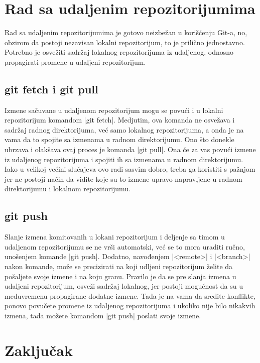 \documentclass[a4paper]{article}
\begin{document}
{\section{Rad sa udaljenim repozitorijumima}
\label{sec:udaljeni_repozitorijumi}
Rad sa udaljenim repozitorijumima je gotovo neizbežan u korišćenju Git-a, no, obzirom da postoji nezavisan lokalni repozitorijum, to je prilično jednostavno. Potrebno je osvežiti sadržaj lokalnog repozitorijuma iz udaljenog, odnosno propagirati promene u udaljeni repozitorijum.


\subsection{git fetch i git pull}
\label{subsec:git_pull}
Izmene sačuvane u udaljenom repozitorijum mogu se povući i u lokalni repozitorijum komandom |git fetch|. Medjutim, ova komanda ne osvežava i sadržaj radnog direktorijuma, već samo lokalnog repozitorijuma, a onda je na vama da to spojite sa izmenama u radnom direktorijumu. Ono što donekle ubrzava i olakšava ovaj proces je komanda |git pull|. Ona će za vas povući izmene iz udaljenog repozitorijuma i spojiti ih sa izmenama u radnom direktorijumu. Iako u velikoj većini slučajeva ovo radi sasvim dobro, treba ga koristiti s pažnjom jer ne postoji način da vidite koje su to izmene upravo napravljene u radnom direktorijumu i lokalnom repozitorijumu.




\subsection{git push}
\label{subsec:git_push}
Slanje izmena komitovanih u lokani repozitorijum i deljenje sa timom u udaljenom repozitorijumu se ne vrši automatski, već se to mora uraditi ručno, unošenjem komande |git push|. Dodatno, navođenjem |<remote>| i |<branch>| nakon komande, može se precizirati na koji udljeni repozitorijum želite da pošaljete svoje izmene i na koju granu. Pravilo je da se pre slanja izmena u udaljeni repozitorijum, osveži sadržaj lokalnog, jer postoji mogućnost da su u međuvremenu propagirane dodatne izmene. Tada je na vama da sredite konflikte, ponovo povučete promene iz udaljenog repozitorijuma i ukoliko nije bilo nikakvih izmena, tada možete komandom |git push| poslati svoje izmene.



\section{Zaključak}
\label{sec:zakljucak}

}
\end{document}
